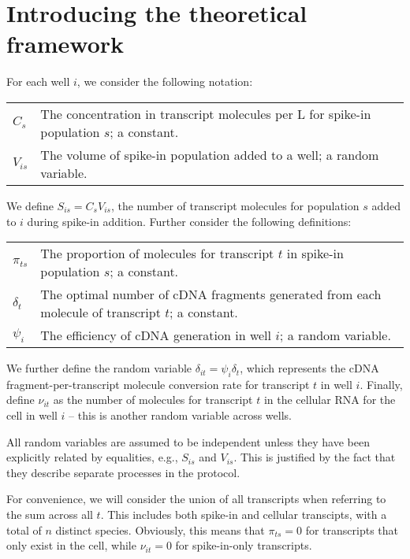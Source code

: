 \documentclass{article}
\begin{document}
\section{Introducing the theoretical framework}
For each well $i$, we consider the following notation:
\begin{center}
\begin{tabular}{l l}
$C_{s}$ & The concentration in transcript molecules per \textmu{}L for spike-in population $s$; a constant. \\
$V_{is}$ & The volume of spike-in population added to a well; a random variable. 
\end{tabular}
\end{center}
We define $S_{is} = C_{s}V_{is}$, the number of transcript molecules for population $s$ added to $i$ during spike-in addition.
Further consider the following definitions:
\begin{center}
\begin{tabular}{l l}
$\pi_{ts}$ & The proportion of molecules for transcript $t$ in spike-in population $s$; a constant. \\
$\delta_{t}$ & The optimal number of cDNA fragments generated from each molecule of transcript $t$; a constant. \\ 
$\psi_i$ & The efficiency of cDNA generation in well $i$; a random variable.
\end{tabular}
\end{center}
We further define the random variable $\delta_{it} = \psi_i\delta_t$, which represents the cDNA fragment-per-transcript molecule conversion rate for transcript $t$ in well $i$.
Finally, define $\nu_{it}$ as the number of molecules for transcript $t$ in the cellular RNA for the cell in well $i$ -- this is another random variable across wells.

All random variables are assumed to be independent unless they have been explicitly related by equalities, e.g., $S_{is}$ and $V_{is}$.
This is justified by the fact that they describe separate processes in the protocol.

For convenience, we will consider the union of all transcripts when referring to the sum across all $t$.
This includes both spike-in and cellular transcipts, with a total of $n$ distinct species.
Obviously, this means that $\pi_{ts}=0$ for transcripts that only exist in the cell, while $\nu_{it}=0$ for spike-in-only transcripts. \\[0.1in]
\end{document}

